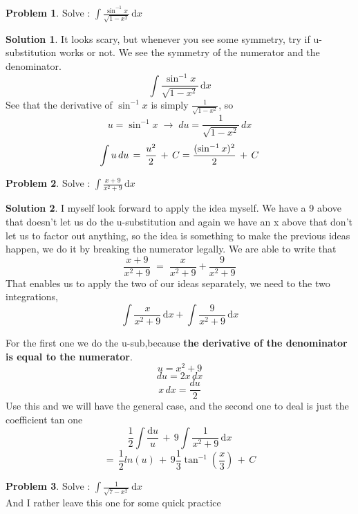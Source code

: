 \documentclass{article}
\theoremstyle{definition}
\newtheorem{prob}{\textsf{Problem}}[section]
\theoremstyle{definition}
\newtheorem{sol}{\textsf{Solution}}[section]
\theoremstyle{definition}
\begin{document}
\begin{prob}
Solve : $ \int \frac{\sin ^{-1}x}{\sqrt{1 - x^2}} \, \mathrm{d} x $
\end{prob}

\begin{sol}
It looks scary, but whenever you see some symmetry, try if u-substitution works or not. We see the symmetry of the numerator and the denominator. 
\[ 
 \int \frac{\sin ^{-1}x}{\sqrt{1 - x^2}} \, \mathrm{d} x 
 \]
See that the derivative of $\sin^{-1} x$ is simply $\frac{1}{\sqrt{  1 - x^2      }}$, so
\[ u = \sin^{-1} x	\; \rightarrow \; du = \frac{1}{\sqrt{  1 - x^2      }} \, dx \]
\[\int u\, du \, = \, \frac{u^2}{2} \,+\, C \\
= \frac{(\sin ^{-1}x)^2}{2} \,+\, C\]
\end{sol}

\begin{prob}
Solve : $ \int \frac{x+9}
								{x^{2} + 9} \, \mathrm{d}x $
\end{prob}
\begin{sol}
I myself look forward to apply the idea myself. We have a 9 above that doesn't let us do the u-substitution and again we have an x above that don't let us to factor out anything, so the idea is something to make the previous ideas happen, we do it by breaking the numerator legally. We are able to write that
\[		\frac{x + 9}{x^{2} + 9}
		\;
		=
		\;
		\frac{x}{x^{2} + 9} 	+ 		\frac{9}{x^{2} + 9}
\]
That enables us to apply the two of our ideas separately, we need to the two integrations,
\[			\int	\frac{x}{x^{2} + 9} \, \mathrm{d} x	+
			\int	\frac{9}{x^{2} + 9} \, \mathrm{d}x  \]

For the first one we do the u-sub,because\textbf{ the derivative of the denominator is equal to the numerator}. 
\[ u = x^{2} + 9 \]
\[ du = 2x \, dx \]
\[ x \, dx = \frac{du}{2}
\]
Use this and we will have the general case, and the second one to deal is just the coefficient tan one
\[ \frac{1}{2}	\int	\frac{\mathrm{d}u }{u}
			\, + \,
	9 \int \frac{1}{ x^{2} + 9}\, \mathrm{d} x
    \]
    \[ = \, \frac{1}{2} ln(u) \, + \, 9\frac{1}{3} \tan ^{-1} (\frac{x}{3})\, +\, C	
\]
\end{sol}
		
		\begin{prob}
		Solve : $ \int \frac{1}
		{\sqrt{7 - x^{2}   }} \, \mathrm{d} x
		$\\
		And I rather leave this one for some quick practice
		\end{prob}
		
\end{document}
